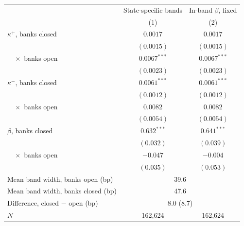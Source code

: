 \begin{tabular}{lcc}
\toprule
 & State-specific bands & In-band $\beta$, fixed \\
 & (1) & (2) \\
\midrule
$\kappa^+$, banks closed & $0.0017$ & $0.0017$ \\
 & $(0.0015)$ & $(0.0015)$ \\
$\quad\times$ banks open & $0.0067^{***}$ & $0.0067^{***}$ \\
 & $(0.0023)$ & $(0.0023)$ \\
$\kappa^-$, banks closed & $0.0061^{***}$ & $0.0061^{***}$ \\
 & $(0.0012)$ & $(0.0012)$ \\
$\quad\times$ banks open & $0.0082$ & $0.0082$ \\
 & $(0.0054)$ & $(0.0054)$ \\
$\beta$, banks closed & $0.632^{***}$ & $0.641^{***}$ \\
 & $(0.032)$ & $(0.039)$ \\
$\quad\times$ banks open & $-0.047$ & $-0.004$ \\
 & $(0.035)$ & $(0.053)$ \\
\midrule
Mean band width, banks open (bp) & \multicolumn{2}{c}{39.6} \\
Mean band width, banks closed (bp) & \multicolumn{2}{c}{47.6} \\
Difference, closed $-$ open (bp) & \multicolumn{2}{c}{8.0 (8.7)} \\
$N$ & 162,624 & 162,624 \\
\bottomrule
\end{tabular}
